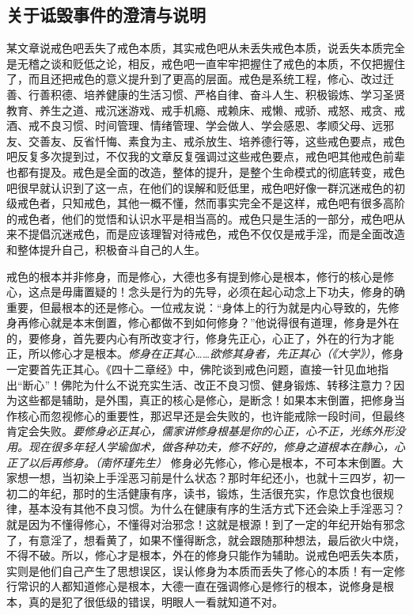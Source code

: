 \subsection{关于诋毁事件的澄清与说明}

某文章说戒色吧丢失了戒色本质，其实戒色吧从未丢失戒色本质，说丢失本质完全是无稽之谈和贬低之论，相反，戒色吧一直牢牢把握住了戒色的本质，不仅把握住了，而且还把戒色的意义提升到了更高的层面。戒色是系统工程，修心、改过迁善、行善积德、培养健康的生活习惯、严格自律、奋斗人生、积极锻炼、学习圣贤教育、养生之道、戒沉迷游戏、戒手机瘾、戒赖床、戒懒、戒骄、戒怒、戒贪、戒酒、戒不良习惯、时间管理、情绪管理、学会做人、学会感恩、孝顺父母、远邪友、交善友、反省忏悔、素食为主、戒杀放生、培养德行等，这些戒色要点，戒色吧反复多次提到过，不仅我的文章反复强调过这些戒色要点，戒色吧其他戒色前辈也都有提及。戒色是全面的改造，整体的提升，是整个生命模式的彻底转变，戒色吧很早就认识到了这一点，在他们的误解和贬低里，戒色吧好像一群沉迷戒色的初级戒色者，只知戒色，其他一概不懂，然而事实完全不是这样，戒色吧有很多高阶的戒色者，他们的觉悟和认识水平是相当高的。戒色只是生活的一部分，戒色吧从来不提倡沉迷戒色，而是应该理智对待戒色，戒色不仅仅是戒手淫，而是全面改造和整体提升自己，积极奋斗自己的人生。

戒色的根本并非修身，而是修心，大德也多有提到修心是根本，修行的核心是修心，这点是毋庸置疑的！念头是行为的先导，必须在起心动念上下功夫，修身的确重要，但最根本的还是修心。一位戒友说：“身体上的行为就是内心导致的，先修身再修心就是本末倒置，修心都做不到如何修身？”他说得很有道理，修身是外在的，要修身，首先要内心有所改变才行，修身先正心，心正了，外在的行为才能正，所以修心才是根本。\textit{修身在正其心……欲修其身者，先正其心（《大学》）}，修身一定要首先正其心。《四十二章经》中，佛陀谈到戒色问题，直接一针见血地指出“断心”！佛陀为什么不说充实生活、改正不良习惯、健身锻炼、转移注意力？因为这些都是辅助，是外围，真正的核心是修心，是断念！如果本末倒置，把修身当作核心而忽视修心的重要性，那迟早还是会失败的，也许能戒除一段时间，但最终肯定会失败。\textit{要修身必正其心，儒家讲修身根基是你的心正，心不正，光练外形没用。现在很多年轻人学瑜伽术，做各种功夫，修不好的，修身之道根本在静心，心正了以后再修身。（南怀瑾先生）} 修身必先修心，修心是根本，不可本末倒置。大家想一想，当初染上手淫恶习前是什么状态？那时年纪还小，也就十三四岁，初一初二的年纪，那时的生活健康有序，读书，锻炼，生活很充实，作息饮食也很规律，基本没有其他不良习惯。为什么在健康有序的生活方式下还会染上手淫恶习？就是因为不懂得修心，不懂得对治邪念！这就是根源！到了一定的年纪开始有邪念了，有意淫了，想看黄了，如果不懂得断念，就会跟随那种想法，最后欲火中烧，不得不破。所以，修心才是根本，外在的修身只能作为辅助。说戒色吧丢失本质，实则是他们自己产生了思想误区，误认修身为本质而丢失了修心的本质！有一定修行常识的人都知道修心是根本，大德一直在强调修心是修行的根本，说修身是根本，真的是犯了很低级的错误，明眼人一看就知道不对。

